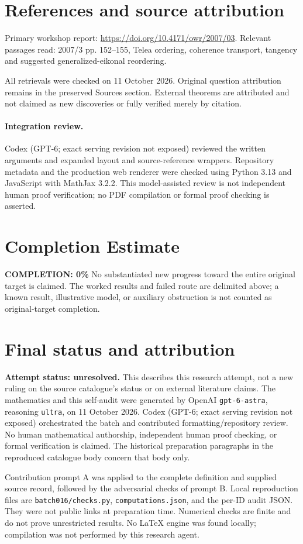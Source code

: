 \documentclass[11pt]{article}
\begin{document}
\section{References and source attribution}
Primary workshop report: \url{https://doi.org/10.4171/owr/2007/03}. Relevant passages read: 2007/3 pp. 152--155, Telea ordering, coherence transport, tangency and suggested generalized-eikonal reordering.

All retrievals were checked on 11 October 2026. Original question attribution remains in the preserved Sources section. External theorems are attributed and not claimed as new discoveries or fully verified merely by citation.


\paragraph{Integration review.} Codex (GPT-6; exact serving revision not exposed) reviewed the written arguments and expanded layout and source-reference wrappers. Repository metadata and the production web renderer were checked using Python 3.13 and JavaScript with MathJax 3.2.2. This model-assisted review is not independent human proof verification; no PDF compilation or formal proof checking is asserted.

\section{Completion Estimate}
\noindent\textbf{COMPLETION: 0\%}
No substantiated new progress toward the entire original target is claimed. The worked results and failed route are delimited above; a known result, illustrative model, or auxiliary obstruction is not counted as original-target completion.

\section{Final status and attribution}
\textbf{Attempt status: unresolved.} This describes this research attempt, not a new ruling on the source catalogue's status or on external literature claims.
The mathematics and this self-audit were generated by OpenAI \texttt{gpt-6-astra}, reasoning \texttt{ultra}, on 11 October 2026. Codex (GPT-6; exact serving revision not exposed) orchestrated the batch and contributed formatting/repository review. No human mathematical authorship, independent human proof checking, or formal verification is claimed. The historical preparation paragraphs in the reproduced catalogue body concern that body only.

Contribution prompt A was applied to the complete definition and supplied source record, followed by the adversarial checks of prompt B. Local reproduction files are \texttt{batch016/checks.py}, \texttt{computations.json}, and the per-ID audit JSON. They were not public links at preparation time. Numerical checks are finite and do not prove unrestricted results. No LaTeX engine was found locally; compilation was not performed by this research agent.
\end{document}
